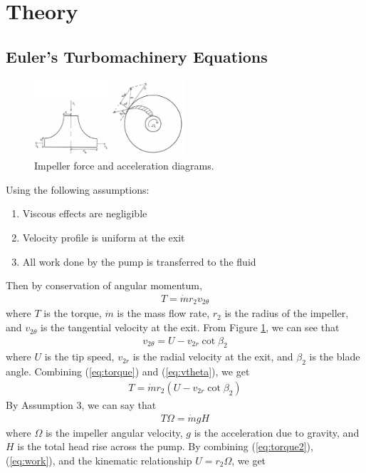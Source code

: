 \section{Theory}
\subsection{Euler's Turbomachinery Equations}
\begin{figure}[h]
    \centering
    \includegraphics[width=0.5\textwidth]{Sections/Figures/theory impeller diagram.png}
    \caption{Impeller force and acceleration diagrams.}
    \label{fig:impeller}
\end{figure}
\noindent Using the following assumptions:
\begin{enumerate}
    \item Viscous effects are negligible
    \item Velocity profile is uniform at the exit
    \item All work done by the pump is transferred to the fluid
\end{enumerate}
Then by conservation of angular momentum,
\begin{align}
    T = \dot{m} r_2 v_{2\theta} \label{eq:torque}
\end{align}
where $T$ is the torque, $\dot{m}$ is the mass flow rate, $r_2$ is the radius of the impeller, and $v_{2\theta}$ is the tangential velocity at the exit. From Figure \ref{fig:impeller}, we can see that 
\begin{align}
    v_{2\theta} = U - v_{2r} \cot{\beta_2} \label{eq:vtheta}
\end{align}
where $U$ is the tip speed, $v_{2r}$ is the radial velocity at the exit, and $\beta_2$ is the blade angle. Combining (\ref{eq:torque}) and (\ref{eq:vtheta}), we get
\begin{align}
    T = \dot{m} r_2 (U - v_{2r} \cot{\beta_2}) \label{eq:torque2}
\end{align}
By Assumption 3, we can say that
\begin{align}
    T \Omega = \dot{m} g H \label{eq:work}
\end{align}
where $\Omega$ is the impeller angular velocity, $g$ is the acceleration due to gravity, and $H$ is the total head rise across the pump. By combining (\ref{eq:torque2}), (\ref{eq:work}), and the kinematic relationship $U = r_2 \Omega$, we get
